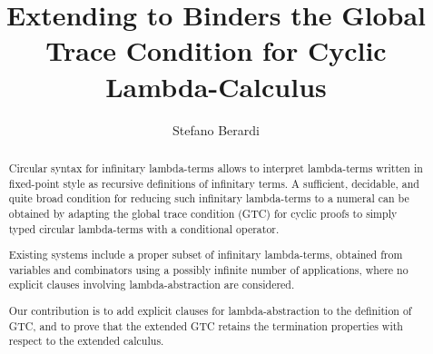 \documentclass[a4paper,anonymous]{lipics-v2021}
\title{Extending to Binders the Global Trace Condition for Cyclic Lambda-Calculus}
\author
    {Stefano Berardi}
    {Computer Science Department, Turin University, Torino, Italy}
    {} %
    {0000-0001-5427-0020} %
    {} %
\begin{document}
\maketitle

\begin{abstract}
%
Circular syntax for infinitary lambda-terms allows to interpret lambda-terms written in fixed-point style as recursive definitions of infinitary terms. A sufficient, decidable, and quite broad condition for reducing such infinitary lambda-terms to a numeral can be obtained by adapting the global trace condition (GTC) for cyclic proofs to simply typed circular lambda-terms with a conditional operator. 

Existing systems include a proper subset of infinitary lambda-terms, obtained from variables and combinators using a possibly infinite number of applications, where no explicit clauses involving lambda-abstraction are considered. 

Our contribution is to add explicit clauses for lambda-abstraction to the definition of GTC, and to prove that the extended GTC retains the termination properties with respect to the extended calculus.
\end{abstract}
\end{document}
